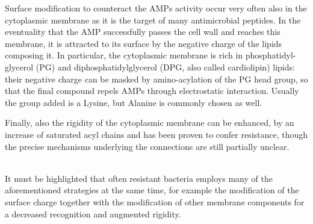 \documentclass[a4paper,11pt]{extreport}
\begin{document}
Surface modification to counteract the AMPs activity occur very often also in the cytoplasmic membrane as it is the target of many antimicrobial peptides. In the eventuality that the AMP successfully passes the cell wall and reaches this membrane, it is attracted to its surface by the negative charge of the lipids composing it. In particular, the cytoplasmic membrane is rich in phosphatidyl-glycerol (PG) and diphosphatidylglycerol (DPG, also called cardiolipin) lipids: their negative charge can be masked by amino-acylation of the PG head group, so that the final compound repels AMPs through electrostatic interaction.\cite{Peschel2001} Usually the group added is a Lysine,\cite{Thedieck 2006} but Alanine is commonly chosen as well.\cite{Klein2009}

Finally, also the rigidity of the cytoplasmic membrane can be enhanced, by an increase of saturated acyl chains and has been proven to confer resistance,\cite{Band2015,Kumariya2015} though the precise mechanisms underlying the connections are still partially unclear.

\hspace{0.5cm}
\\
It must be highlighted that often resistant bacteria employs many of the aforementioned strategies at the same time, for example the modification of the surface charge together with the modification of other membrane components for a decreased recognition and augmented rigidity.\cite{Raetz2007}
\end{document}
